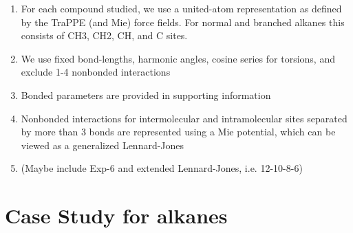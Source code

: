 \documentclass[preprint,letterpaper,floatfix,citeautoscript,aip,jcp]{revtex4-1}
\begin{document}
\begin{enumerate}
	\item For each compound studied, we use a united-atom representation as defined by the TraPPE (and Mie) force fields. For normal and branched alkanes this consists of CH3, CH2, CH, and C sites.
	\item We use fixed bond-lengths, harmonic angles, cosine series for torsions, and exclude 1-4 nonbonded interactions 
	\item Bonded parameters are provided in supporting information
	\item Nonbonded interactions for intermolecular and intramolecular sites separated by more than 3 bonds are represented using a Mie potential, which can be viewed as a generalized Lennard-Jones
	\item (Maybe include Exp-6 and extended Lennard-Jones, i.e. 12-10-8-6)
\end{enumerate}

\section{Case Study for alkanes}
\end{document}
